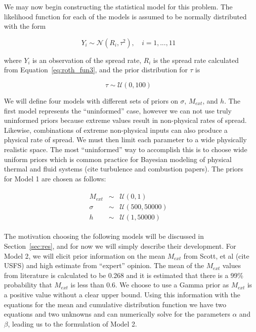 \documentclass[11pt]{article}
\begin{document}
We may now begin constructing the statistical model for this problem. The likelihood function for each of the models is assumed to be normally distributed with the form

\begin{equation}
Y_i \sim \mathcal{N}(R_i,\tau^2),\quad i = 1,...,11
\label{eq:like}
\end{equation}

\noindent where $Y_i$ is an observation of the spread rate, $R_i$ is the spread rate calculated from Equation~\ref{eq:roth_fun3}, and the prior distribution for $\tau$ is

\begin{equation}
\tau \sim \mathcal{U}(0,100)
\label{eq:tau_prior}
\end{equation}

We will define four models with different sets of priors on $\sigma$, $M_{ext}$, and $h$. The first model represents the ``uninformed'' case, however we can not use truly uninformed priors because extreme values result in non-physical rates of spread. Likewise, combinations of extreme non-physical inputs can also produce a physical rate of spread. We must then limit each parameter to a wide physically realistic space. The most ``uninformed'' way to accomplish this is to choose wide uniform priors which is common practice for Bayesian modeling of physical thermal and fluid systems (cite turbulence and combustion papers). The priors for Model 1 are chosen as follows:

\begin{align}
\begin{array}{ccc}
M_{ext} &\sim& \mathcal{U}(0,1) \\
\sigma &\sim& \mathcal{U}(500,50000) \\
h &\sim& \mathcal{U}(1,50000)
\end{array}
\label{eq:mod1_priors}
\end{align}

The motivation choosing the following models will be discussed in Section~\ref{sec:res}, and for now we will simply describe their development. For Model 2, we will elicit prior information on the mean $M_{ext}$ from Scott, et al (cite USFS) and high estimate from ``expert'' opinion. The mean of the $M_{ext}$ values from literature is calculated to be 0.268 and it is estimated that there is a 99\% probability that $M_{ext}$ is less than 0.6. We choose to use a Gamma prior as $M_{ext}$ is a positive value without a clear upper bound. Using this information with the equations for the mean and cumulative distribution function we have two equations and two unknowns and can numerically solve for the parameters $\alpha$ and $\beta$, leading us to the formulation of Model 2.
\end{document}
